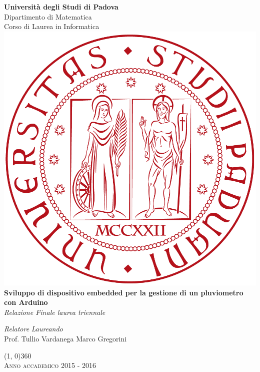 \documentclass[11pt]{book}              %
\begin{document}
\frontmatter

\begin{titlepage}
\centering  
\textbf{\huge{Università degli Studi di Padova}} \\
\vspace{0.3cm}
\huge{Dipartimento di Matematica} \\
\vspace{0.3cm}
\LARGE{Corso di Laurea in Informatica} \\

\vspace{1cm}
\includegraphics[scale=0.2]{img/Logo_Unipd.png}  \\
\vspace{1cm}
\hspace{0.5cm}\textbf{\LARGE{ Sviluppo di dispositivo embedded per la gestione di un pluviometro con Arduino}}\\
\vspace{0.5cm}
\textit{Relazione Finale laurea triennale}\\
\vspace{0.5cm}

\begin{flushleft}
\textit{Relatore} \hfill \textit{Laureando}\\
Prof. Tullio Vardanega \hfill Marco Gregorini

\end{flushleft}
\line(1, 0){360}\\
\textsc{\small{Anno accademico 2015 - 2016}}
\end{titlepage}
\end{document}
